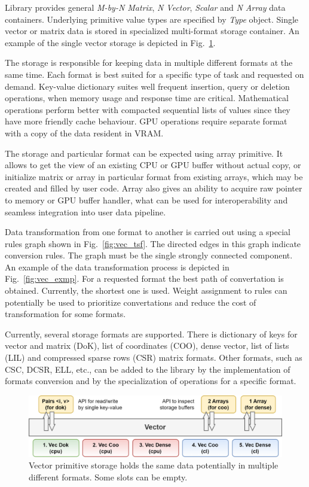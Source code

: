 Library provides general \textit{M-by-N Matrix}, \textit{N Vector}, \textit{Scalar} and \textit{N Array} data containers.
Underlying primitive value types are specified by \textit{Type} object. 
Single vector or matrix data is stored in specialized multi-format storage container. An example of the single vector storage is depicted in Fig.~\ref{fig:vec_storage}. 

The storage is responsible for keeping data in multiple different formats at the same time. 
Each format is best suited for a specific type of task and requested on demand. 
Key-value dictionary suites well frequent insertion, query or deletion operations, when memory usage and response time are critical. 
Mathematical operations perform better with compacted sequential lists of values since they have more friendly cache behaviour. 
GPU operations require separate format with a copy of the data resident in VRAM.

The storage and particular format can be expected using array primitive. It allows to get the view of an existing CPU or GPU buffer without actual copy, or initialize matrix or array in particular format from existing arrays, which may be created and filled by user code. Array also gives an ability to acquire raw pointer to memory or GPU buffer handler, what can be used for interoperability and seamless integration into user data pipeline.

Data transformation from one format to another is carried out using a special rules graph shown in Fig.~\ref{fig:vec_tsf}. 
The directed edges in this graph indicate conversion rules. 
The graph must be the single strongly connected component. 
An example of the data transformation process is depicted in Fig.~\ref{fig:vec_exmp}. 
For a requested format the best path of convertation is obtained. Currently, the shortest one is used. 
Weight assignment to rules can potentially be used to prioritize convertations and reduce the cost of transformation for some formats. 

Currently, several storage formats are supported. 
There is dictionary of keys for vector and matrix (DoK), list of coordinates (COO), dense vector, list of lists (LIL) and compressed sparse rows (CSR) matrix formats.  
Other formats, such as CSC, DCSR, ELL, etc., can be added to the library by the implementation of formats conversion and by the specialization of operations for a specific format. 

\begin{figure}[b]
\centering
\includegraphics[width=0.9\linewidth]{figures/vector_storage.png}
\caption{Vector primitive storage holds the same data potentially in multiple different formats. Some slots can be empty.}
\label{fig:vec_storage}
\end{figure}


